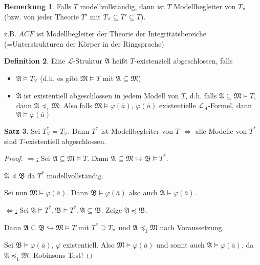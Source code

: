 \documentclass[12pt,parskip=full]{scrartcl}
\newcommand{\heading}{\underline}
\theoremstyle{definition}
\newtheorem{theorem}{Satz}[section]
\newtheorem{definition}[theorem]{Definition}
\newtheorem{remark}[theorem]{Bemerkung}
\begin{document}
	\begin{remark}
		Falls $T$ modellvollständig, dann ist $T$ Modellbegleiter von $T_\forall$ (bzw. von jeder Theorie $T'$ mit $T_\forall \subseteq T' \subseteq T$).
		
		z.B. $ACF$ ist Modellbegleiter der Theorie der Integritätsbereiche (=Unterstrukturen der Körper in der Ringsprache)
	\end{remark}

	\begin{definition}
		Eine $\mathcal{L}$-Struktur $\mathfrak{A}$ heißt $T$-existenziell abgeschlossen, falls
		\begin{itemize}
			\item $\mathfrak{A} \models T_\forall$ (d.h. es gibt $\mathfrak{M} \models T$ mit $\mathfrak{A} \subseteq \mathfrak{M}$)
			\item $\mathfrak{A}$ ist existentiell abgeschlossen in jedem Modell von $T$, d.h. falls $\mathfrak{A} \subseteq \mathfrak{M} \models T$, dann $\mathfrak{A} \preccurlyeq_1  \mathfrak{M}$: Also falls $\mathfrak{M} \models \varphi(\overline{a})$, $\varphi(\overline{a})$ existentielle $\mathcal{L}_A$-Formel, dann $\mathfrak{A} \models \varphi(\overline{a})$
		\end{itemize}
	\end{definition}

	\begin{theorem}
		Sei $T_\forall^* = T_\forall$. Dann $T^*$ ist Modellbegleiter von $T$ $\Leftrightarrow$ alle Modelle von $T^*$ sind $T$-existentiell abgeschlossen.
	\end{theorem}

	\begin{proof}
		\heading{$\Rightarrow$:} Sei $\mathfrak{A} \subseteq \mathfrak{M} \models T$. Dann $\mathfrak{A} \subseteq \mathfrak{M} \hookrightarrow \mathfrak{B} \models T^*$.
		
		$\mathfrak{A} \preccurlyeq \mathfrak{B}$ da $T^*$ modellvollständig.
		
		Sei nun $\mathfrak{M} \models \varphi(\overline{a})$. Dann $\mathfrak{B} \models \varphi(\overline{a})$ also auch $\mathfrak{A} \models \varphi(\overline{a})$.
		
		\heading{$\Leftrightarrow$:} Sei $\mathfrak{A} \models T^*, \mathfrak{B} \models T^*, \mathfrak{A} \subseteq \mathfrak{B}$. Zeige $\mathfrak{A} \preccurlyeq \mathfrak{B}$.
		
		Dann $\mathfrak{A} \subseteq \mathfrak{B} \hookrightarrow \mathfrak{M} \models T$ mit $T^* \supseteq T_\forall$ und $\mathfrak{A} \preccurlyeq_1 \mathfrak{M}$ nach Voraussetzung.
		
		Sei $\mathfrak{B} \models \varphi(\overline{a})$, $\varphi$ existentiell. Also $\mathfrak{M} \models \varphi(\overline{a})$ und somit auch $\mathfrak{A} \models \varphi(\overline{a})$, da $\mathfrak{A} \preccurlyeq_1 \mathfrak{M}$. Robinsons Test!
	\end{proof}
\end{document}
